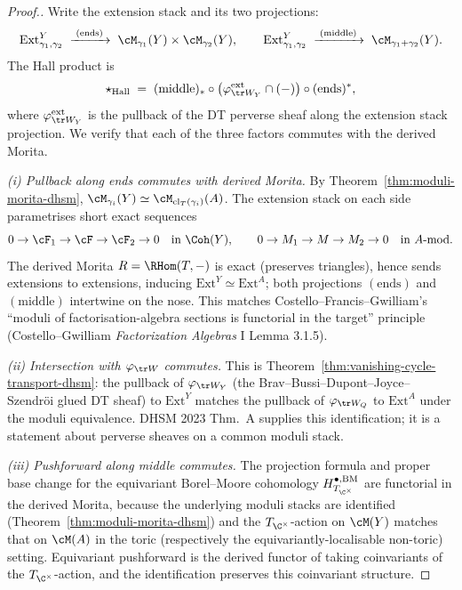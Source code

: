 \begin{proof}[Proof.]
Write the extension stack and its two projections:
\[
 \mathrm{Ext}_{\gamma_1, \gamma_2}^{Y} \;\xrightarrow{\;(\mathrm{ends})\;}\;
 \cM_{\gamma_1}(Y) \times \cM_{\gamma_2}(Y),
 \qquad
 \mathrm{Ext}_{\gamma_1, \gamma_2}^{Y} \;\xrightarrow{\;(\mathrm{middle})\;}\;
 \cM_{\gamma_1 + \gamma_2}(Y).
\]
The Hall product is
\[
 \star_{\mathrm{Hall}} \;=\; (\mathrm{middle})_{*}
 \circ \bigl( \varphi_{\tr W_Y}^{\mathrm{ext}} \cap (-)\bigr)
 \circ (\mathrm{ends})^{*},
\]
where $\varphi_{\tr W_Y}^{\mathrm{ext}}$ is the pullback of the DT perverse sheaf along the extension stack projection. We verify that each of the three factors commutes with the derived Morita.

\emph{(i) Pullback along ends commutes with derived Morita.} By Theorem~\ref{thm:moduli-morita-dhsm}, $\cM_{\gamma_i}(Y) \simeq \cM_{\mathrm{cl}_T(\gamma_i)}(A)$. The extension stack on each side parametrises short exact sequences
\[
 0 \to \cF_1 \to \cF \to \cF_2 \to 0 \quad \text{in } \Coh(Y),
 \qquad
 0 \to M_1 \to M \to M_2 \to 0 \quad \text{in } A\text{-}\mathrm{mod}.
\]
The derived Morita $R = \RHom(T, -)$ is exact (preserves triangles), hence sends extensions to extensions, inducing $\mathrm{Ext}^{Y} \simeq \mathrm{Ext}^{A}$; both projections $(\mathrm{ends})$ and $(\mathrm{middle})$ intertwine on the nose. This matches Costello--Francis--Gwilliam's ``moduli of factorisation-algebra sections is functorial in the target'' principle (Costello--Gwilliam \emph{Factorization Algebras} I Lemma 3.1.5).

\emph{(ii) Intersection with $\varphi_{\tr W}$ commutes.} This is Theorem~\ref{thm:vanishing-cycle-transport-dhsm}: the pullback of $\varphi_{\tr W_Y}$ (the Brav--Bussi--Dupont--Joyce--Szendr\"oi glued DT sheaf) to $\mathrm{Ext}^{Y}$ matches the pullback of $\varphi_{\tr W_Q}$ to $\mathrm{Ext}^{A}$ under the moduli equivalence. DHSM 2023 Thm.~A supplies this identification; it is a statement about perverse sheaves on a common moduli stack.

\emph{(iii) Pushforward along middle commutes.} The projection formula and proper base change for the equivariant Borel--Moore cohomology $H^{\bullet, \mathrm{BM}}_{T_{\C^\times}}$ are functorial in the derived Morita, because the underlying moduli stacks are identified (Theorem~\ref{thm:moduli-morita-dhsm}) and the $T_{\C^\times}$-action on $\cM(Y)$ matches that on $\cM(A)$ in the toric (respectively the equivariantly-localisable non-toric) setting. Equivariant pushforward is the derived functor of taking coinvariants of the $T_{\C^\times}$-action, and the identification preserves this coinvariant structure.


\end{proof}

